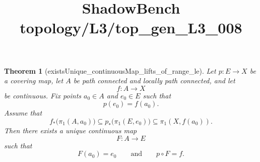 \documentclass{article}
\title{ShadowBench topology/L3/top\_gen\_L3\_008}
\newtheorem{theorem}{Theorem}
\begin{document}
\maketitle

\begin{theorem}[existsUnique_continuousMap_lifts_of_range_le]
Let \(p : E \to X\) be a covering map, let \(A\) be path connected and locally path connected, and let
\[
f : A \to X
\]
be continuous. Fix points \(a_0 \in A\) and \(e_0 \in E\) such that
\[
p(e_0)=f(a_0).
\]
Assume that
\[
f_*\bigl(\pi_1(A,a_0)\bigr)\subseteq p_*\bigl(\pi_1(E,e_0)\bigr)
\subseteq \pi_1(X,f(a_0)).
\]
Then there exists a unique continuous map
\[
F : A \to E
\]
such that
\[
F(a_0)=e_0
\qquad\text{and}\qquad
p\circ F=f.
\]
\end{theorem}
\end{document}
